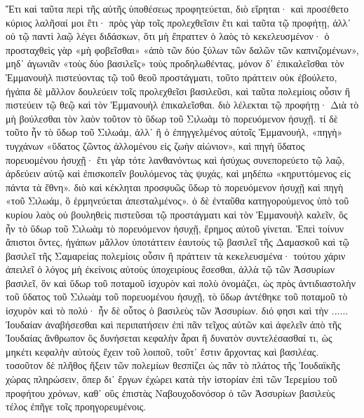 
Ἔτι
καὶ
ταῦτα
περὶ
τῆς
αὐτῆς
ὑποθέσεως
προφητεύεται,
διὸ
εἴρηται·
καὶ
προσέθετο
κύριος
λαλῆσαί
μοι
ἔτι·
πρὸς
γὰρ
τοῖς
προλεχθεῖσιν
ἔτι
καὶ
ταῦτα
τῷ
προφήτῃ,
ἀλλ᾽
οὐ
τῷ
παντὶ
λαῷ
λέγει
διδάσκων,
ὅτι
μὴ ἔπραττεν
ὁ
λαὸς
τὸ
κεκελευσμένον·
ὁ
προσταχθεὶς
γὰρ
«μὴ
φοβεῖσθαι»
«ἀπὸ
τῶν
δύο
ξύλων
τῶν
δαλῶν
τῶν
καπνιζομένων»,
μηδ᾽
ἀγωνιᾶν
«τοὺς
δύο
βασιλεῖς»
τοὺς
προδηλωθέντας,
μόνον
δ᾽
ἐπικαλεῖσθαι
τὸν
Ἐμμανουὴλ
πιστεύοντας
τῷ
τοῦ
θεοῦ
προστάγματι,
τοῦτο
πράττειν
οὐκ
ἐβούλετο,
ἠγάπα
δὲ
μᾶλλον
δουλεύειν
τοῖς
προλεχθεῖσι
βασιλεῦσι,
καὶ
ταῦτα
πολεμίοις
οὖσιν
ἢ
πιστεύειν
τῷ
θεῷ
καὶ
τὸν
Ἐμμανουὴλ
ἐπικαλεῖσθαι.
διὸ
λέλεκται
τῷ
προφήτῃ·
Διὰ
τὸ
μὴ
βούλεσθαι
τὸν
λαὸν
τοῦτον
τὸ
ὕδωρ
τοῦ
Σιλωὰμ
τὸ
πορευόμενον
ἡσυχῇ.
τί
δὲ
τοῦτο
ἦν
τὸ
ὕδωρ
τοῦ
Σιλωάμ,
ἀλλ᾽
ἢ
ὁ
ἐπηγγελμένος
αὐτοῖς
Ἐμμανουήλ,
«πηγὴ»
τυγχάνων
«ὕδατος
ζῶντος
ἁλλομένου
εἰς
ζωὴν
αἰώνιον»,
καὶ
πηγὴ
ὕδατος
πορευομένου
ἡσυχῇ·
ἔτι
γὰρ
τότε
λανθανόντως
καὶ
ἡσύχως
συνεπορεύετο
τῷ
λαῷ,
ἀρδεύειν
αὐτῷ
καὶ
ἐπισκοπεῖν
βουλόμενος
τὰς
ψυχάς,
καὶ
μηδέπω
«κηρυττόμενος
εἰς
πάντα
τὰ
ἔθνη».
διὸ
καὶ
κέκληται
προσφυῶς
ὕδωρ
τὸ
πορευόμενον
ἡσυχῇ
καὶ
πηγὴ
«τοῦ
Σιλωάμ,
ὃ
ἑρμηνεύεται
ἀπεσταλμένος».
ὁ
δὲ
ἐνταῦθα
κατηγορούμενος
ὑπὸ
τοῦ
κυρίου
λαὸς
οὐ
βουληθεὶς
πιστεῦσαι
τῷ
προστάγματι
καὶ
τὸν
Ἐμμανουὴλ
καλεῖν,
ὃς
ἦν
τὸ
ὕδωρ
τοῦ
Σιλωὰμ
τὸ
πορευόμενον
ἡσυχῇ,
ἔρημος
αὐτοῦ
γίνεται.
Ἐπεὶ
τοίνυν
ἄπιστοι
ὄντες,
ἠγάπων
μᾶλλον
ὑποτάττειν
ἑαυτοὺς
τῷ
βασιλεῖ
τῆς
Δαμασκοῦ
καὶ
τῷ
βασιλεῖ
τῆς
Σαμαρείας
πολεμίοις
οὖσιν
ἢ
πράττειν
τὰ
κεκελευσμένα·
τούτου
χάριν
ἀπειλεῖ
ὁ
λόγος
μὴ
ἐκείνοις
αὐτοὺς
ὑποχειρίους
ἔσεσθαι,
ἀλλὰ
τῷ
τῶν
Ἀσσυρίων
βασιλεῖ,
ὃν
καὶ
ὕδωρ
τοῦ
ποταμοῦ
ἰσχυρὸν
καὶ
πολὺ
ὀνομάζει,
ὡς
πρὸς
ἀντιδιαστολὴν
τοῦ
ὕδατος
τοῦ
Σιλωὰμ
τοῦ
πορευομένου
ἡσυχῇ,
τὸ
ὕδωρ
ἀντέθηκε
τοῦ
ποταμοῦ
τὸ
ἰσχυρὸν
καὶ
τὸ
πολύ·
ἦν
δὲ
οὗτος
ὁ
βασιλεὺς
τῶν
Ἀσσυρίων.
διό
φησι
καὶ
τὴν
......
Ἰουδαίαν
ἀναβήσεσθαι
καὶ
περιπατήσειν
ἐπὶ
πᾶν
τεῖχος
αὐτῶν
καὶ
ἀφελεῖν
ἀπὸ
τῆς
Ἰουδαίας
ἄνθρωπον
ὃς
δυνήσεται
κεφαλὴν
ἆραι
ἢ
δυνατὸν
συντελέσασθαί
τι,
ὡς
μηκέτι
κεφαλὴν
αὐτοὺς
ἔχειν
τοῦ
λοιποῦ,
τοῦτ᾽
ἔστιν
ἄρχοντας
καὶ
βασιλέας.
τοσοῦτον
δὲ
πλῆθος
ἥξειν
τῶν
πολεμίων
θεσπίζει
ὡς
πᾶν
τὸ
πλάτος
τῆς
Ἰουδαϊκῆς
χώρας
πληρώσειν,
ὅπερ
δι᾽
ἔργων
ἐχώρει
κατὰ
τὴν
ἱστορίαν
ἐπὶ
τῶν
Ἰερεμίου
τοῦ
προφήτου
χρόνων,
καθ᾽
οὓς
ἐπιστὰς
Ναβουχοδονόσορ
ὁ
τῶν
Ἀσσυρίων
βασιλεὺς
τέλος
ἐπῆγε
τοῖς
προηγορευμένοις.

